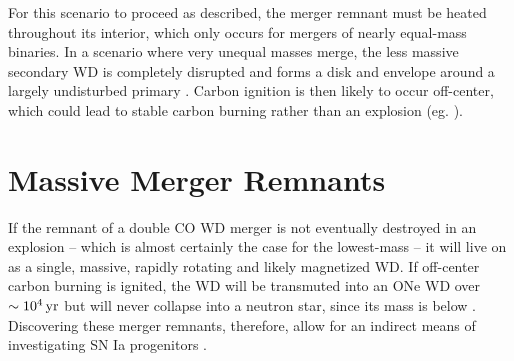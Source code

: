 For this scenario to proceed as described, the merger remnant must be heated throughout its interior, which only occurs for mergers of nearly equal-mass binaries.  In a scenario where very unequal masses merge, the less massive secondary WD is completely disrupted and forms a disk and envelope around a largely undisturbed primary \citep{loreig09}.  Carbon ignition is then likely to occur off-center, which could lead to stable carbon burning rather than an explosion (eg. \citealt{yoonpr07, shen+12}).

\section{Massive Merger Remnants}
\label{sec:c1_hotdqs}

If the remnant of a double CO WD merger is not eventually destroyed in an explosion -- which is almost certainly the case for the lowest-mass -- it will live on as a single, massive, rapidly rotating and likely magnetized WD.  If off-center carbon burning is ignited, the WD will be transmuted into an ONe WD over $\sim10^4\,\mathrm{yr}$ \citep{nomoi85, shen+12} but will never collapse into a neutron star, since its mass is below \Mch.  Discovering these merger remnants, therefore, allow for an indirect means of investigating SN Ia progenitors \citep{dunlc15}.



